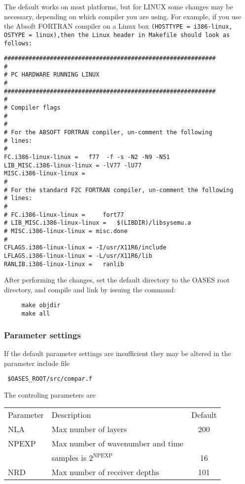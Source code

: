 The default works on most platforms, but
for LINUX some changes may be  necessary, depending on which compiler you
are using. For example, if you use the Absoft FORTRAN compiler on a
Linux box \tt (HOSTTYPE = i386-linux, OSTYPE = linux),\rm then the Linux 
header in Makefile should look as follows: 
 
\begin{verbatim}
############################################################
#
# PC HARDWARE RUNNING LINUX 
#
############################################################
#
# Compiler flags
#
#
# For the ABSOFT FORTRAN compiler, un-comment the following
# lines:
#
FC.i386-linux-linux =	f77  -f -s -N2 -N9 -N51
LIB_MISC.i386-linux-linux = -lV77 -lU77
MISC.i386-linux-linux = 
#
# For the standard F2C FORTRAN compiler, un-comment the following
# lines:
#
# FC.i386-linux-linux =		fort77
# LIB_MISC.i386-linux-linux = 	$(LIBDIR)/libsysemu.a
# MISC.i386-linux-linux = misc.done
#
CFLAGS.i386-linux-linux = -I/usr/X11R6/include 
LFLAGS.i386-linux-linux = -L/usr/X11R6/lib 
RANLIB.i386-linux-linux =	ranlib
\end{verbatim}

\noindent    After  performing  the changes, set the default
directory to the OASES root directory, and compile and link  by issuing the 
command:

\begin{verbatim}
     make objdir
     make all
\end{verbatim}

\subsubsection{Parameter settings}

If  the default parameter settings are insufficient they  may 
be  altered in the parameter include file 
\begin{verbatim}
 $OASES_ROOT/src/compar.f
\end{verbatim} 
The controling parameters are

\begin{tabular}{llc}
    Parameter & Description & Default \\
    NLA    &    Max number of layers  & 200 \\
    NPEXP  &    Max number of wavenumber and time  & \\
           &    samples is $ 2^{\mbox{NPEXP} } $ &  16 \\
    NRD    &    Max number of receiver depths & 101 
\end{tabular}

